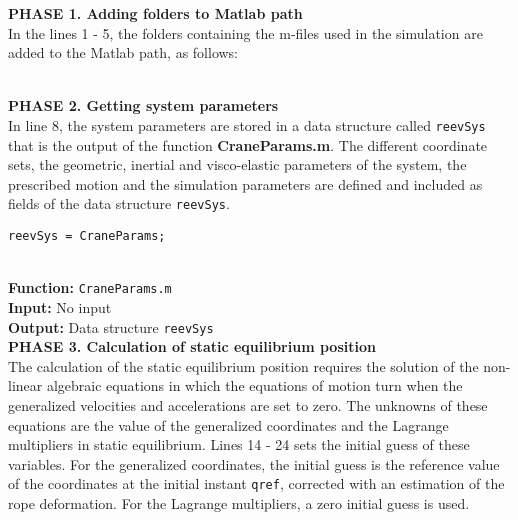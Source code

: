 \textbf{PHASE 1. Adding folders to Matlab path} \\

In the lines 1 - 5, the folders containing the m-files used in the simulation are added to the Matlab path, as follows:

\begin{tcolorbox}{{\begin{lstlisting}[style=Matlab-editor]
restoredefaultpath;
addpath("../../GeneralReevingSystems");
addpath("../../WireRopeForces");
addpath("../../mexInterface");
addpath("RB_kinematics");
\end{lstlisting}}
\end{tcolorbox} \\

\textbf{PHASE 2. Getting system parameters} \\

In line 8, the system parameters are stored in a data structure called \texttt{reevSys} that is the output of the function \textbf{CraneParams.m}. The different coordinate sets, the geometric, inertial and visco-elastic parameters of the system, the prescribed motion and the simulation parameters are defined and included as fields of the data structure \texttt{reevSys}. 

\begin{tcolorbox}{\begin{lstlisting}[style=Matlab-editor]
% Getting system parameters %
reevSys = CraneParams;
\end{lstlisting}}
\end{tcolorbox}\\

\setlength{\parindent}{0cm}
\textbf{Function:} \texttt{CraneParams.m} \\
\textbf{Input:} No input \\
\textbf{Output:} Data structure \texttt{reevSys} \\

\textbf{PHASE 3. Calculation of static equilibrium position} \\

The calculation of the static equilibrium position requires the solution of the non-linear algebraic equations in which the equations of motion turn when the generalized velocities and accelerations are set to zero. The unknowns of these equations are the value of the generalized coordinates and the Lagrange multipliers in static equilibrium. Lines 14 - 24 sets the initial guess of these variables. For the generalized coordinates, the initial guess is the reference value of the coordinates at the initial instant \texttt{qref}, corrected with an estimation of the rope deformation. For the Lagrange multipliers, a zero initial guess is used.


